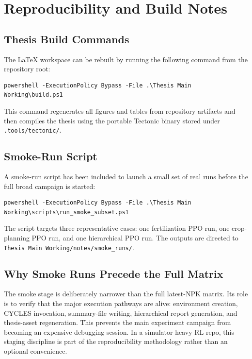 \chapter{Reproducibility and Build Notes}

\section{Thesis Build Commands}

The LaTeX workspace can be rebuilt by running the following command from the repository root:
\begin{verbatim}
powershell -ExecutionPolicy Bypass -File .\Thesis Main Working\build.ps1
\end{verbatim}

This command regenerates all figures and tables from repository artifacts and then compiles the thesis using the portable Tectonic binary stored under \texttt{.tools/tectonic/}.

\section{Smoke-Run Script}

A smoke-run script has been included to launch a small set of real runs before the full broad campaign is started:
\begin{verbatim}
powershell -ExecutionPolicy Bypass -File .\Thesis Main Working\scripts\run_smoke_subset.ps1
\end{verbatim}

The script targets three representative cases: one fertilization PPO run, one crop-planning PPO run, and one hierarchical PPO run. The outputs are directed to \texttt{Thesis Main Working/notes/smoke\_runs/}.

\section{Why Smoke Runs Precede the Full Matrix}

The smoke stage is deliberately narrower than the full latest-NPK matrix. Its role is to verify that the major execution pathways are alive: environment creation, CYCLES invocation, summary-file writing, hierarchical report generation, and thesis-asset regeneration. This prevents the main experiment campaign from becoming an expensive debugging session. In a simulator-heavy RL repo, this staging discipline is part of the reproducibility methodology rather than an optional convenience.

